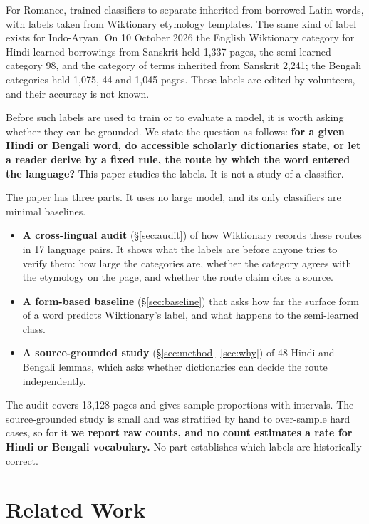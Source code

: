 \documentclass[11pt]{article}
\begin{document}
For Romance, \citet{cristea2021inherited} trained classifiers to separate inherited from borrowed Latin words, with labels taken from Wiktionary etymology templates. The same kind of label exists for Indo-Aryan. On 10 October 2026 the English Wiktionary category for Hindi learned borrowings from Sanskrit held 1,337 pages, the semi-learned category 98, and the category of terms inherited from Sanskrit 2,241; the Bengali categories held 1,075, 44 and 1,045 pages. These labels are edited by volunteers, and their accuracy is not known.

Before such labels are used to train or to evaluate a model, it is worth asking whether they can be grounded. We state the question as follows: \textbf{for a given Hindi or Bengali word, do accessible scholarly dictionaries state, or let a reader derive by a fixed rule, the route by which the word entered the language?} This paper studies the labels. It is not a study of a classifier.

The paper has three parts. It uses no large model, and its only classifiers are minimal baselines.
\begin{itemize}
\item \textbf{A cross-lingual audit} (\S\ref{sec:audit}) of how Wiktionary records these routes in 17 language pairs. It shows what the labels are before anyone tries to verify them: how large the categories are, whether the category agrees with the etymology on the page, and whether the route claim cites a source.
\item \textbf{A form-based baseline} (\S\ref{sec:baseline}) that asks how far the surface form of a word predicts Wiktionary's label, and what happens to the semi-learned class.
\item \textbf{A source-grounded study} (\S\ref{sec:method}--\ref{sec:why}) of 48 Hindi and Bengali lemmas, which asks whether dictionaries can decide the route independently.
\end{itemize}
The audit covers 13,128 pages and gives sample proportions with intervals. The source-grounded study is small and was stratified by hand to over-sample hard cases, so for it \textbf{we report raw counts, and no count estimates a rate for Hindi or Bengali vocabulary.} No part establishes which labels are historically correct.

\section{Related Work}
\end{document}

